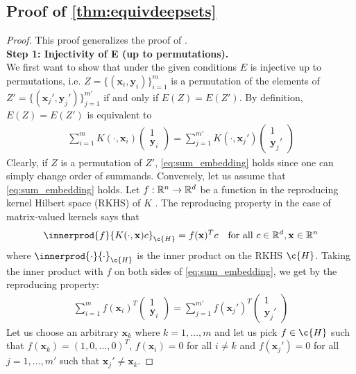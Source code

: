 \subsection{Proof of \cref{thm:equivdeepsets}}
\label{proof:equivdeepsets}
\begin{proof}
	This proof generalizes the proof of \textcite[Theorem 1]{ConvCNP}.
	\\
	\textbf{Step 1: Injectivity of E (up to permutations).}\\ We first want to show that under the given conditions $E$ is injective up to permutations, i.e. $Z=\{(\mathbf{x}_i,\mathbf{y}_i)\}_{i=1}^{m}$ is a permutation of the elements of $Z'=\{(\mathbf{x}_j',\mathbf{y}_j')\}_{j=1}^{m'}$ if and only if $E(Z)=E(Z')$.
	By definition, $E(Z)=E(Z')$ is equivalent to \begin{align} \label{eq:sum_embedding} \sum\limits_{i=1}^{m}K(\cdot,\mathbf{x}_i)\begin{pmatrix} 1 \\ \mathbf{y}_i \end{pmatrix}= \sum\limits_{j=1}^{m'}K(\cdot,\mathbf{x}_j')\begin{pmatrix} 1 \\ \mathbf{y}_j' \end{pmatrix} \end{align} Clearly, if $Z$ is a permutation of $Z'$, \cref{eq:sum_embedding} holds since one can simply change order of summands.
	Conversely, let us assume that \cref{eq:sum_embedding} holds.
	Let $f:\mathbb{R}^n\to\mathbb{R}^d$ be a function in the reproducing kernel Hilbert space (RKHS) of $K$ \parencite{Review_matrix_kernels}.
	The reproducing property in the case of matrix-valued kernels says that \begin{align} \innerprod{f}{K(\cdot,\mathbf{x})c}_{\c{H}}=f(\mathbf{x})^Tc \quad\text{for all }c\in\R^d,\mathbf{x}\in\R^n \end{align} where $\innerprod{\cdot}{\cdot}_{\c{H}}$ is the inner product on the RKHS $\c{H}$.
	Taking the inner product with $f$ on both sides of \cref{eq:sum_embedding}, we get by the reproducing property: \begin{align} \label{eq:reproducing_property} \sum\limits_{i=1}^{m}f(\mathbf{x}_i)^T\begin{pmatrix} 1 \\ \mathbf{y}_i \end{pmatrix}= \sum\limits_{j=1}^{m'}f(\mathbf{x}_j')^T\begin{pmatrix} 1 \\ \mathbf{y}_j' \end{pmatrix} \end{align} Let us choose an arbitrary $\mathbf{x}_k$ where $k=1,\dots,m$ and let us pick $f\in\c{H}$ such that $f(\mathbf{x}_k)=(1,0,\dots,0)^T$, $f(\mathbf{x}_i)=0$ for all $i\neq k$ and $f(\mathbf{x}_j')=0$ for all $j=1,\dots,m'$ such that $\mathbf{x}_j'\neq \mathbf{x}_k$.

\end{proof}
